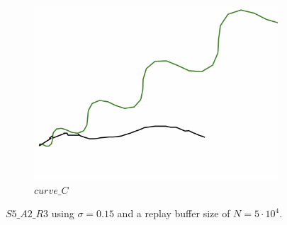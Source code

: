 \begin{figure}[H]
\begin{subfigure}[b]{0.31\textwidth}
         \includegraphics[width=\textwidth]{images/ddpg_results/envs_S3_S4_S5/S5_A2_R3_curve_C.png}
         \caption{$curve\_C$}
     \end{subfigure}
        \caption{$S5\_A2\_R3$ using $\sigma=0.15$ and a replay buffer size of $N=5\cdot 10^4$.}
        \label{fig:advCurves3}
\end{figure}

